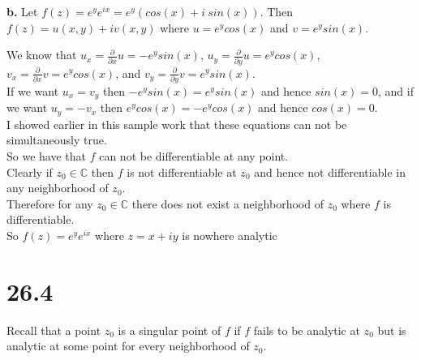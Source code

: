\documentclass{article}
\begin{document}
{\Large\textbf{b.}} Let $f(z) = e^y e^{ix} = e^y (cos(x) + i\:sin(x))$. Then $f(z) = u(x, y) + iv(x, y)$ where $u = e^y cos(x)$ and $v = e^y sin(x)$.
\begin{center}
    \doublespacing
    We know that $u_x =\frac{\partial}{\partial x} u = - e^y sin(x)$, $u_y =\frac{\partial}{\partial y} u = e^y cos(x)$, $v_x =\frac{\partial}{\partial x} v = e^y cos(x)$, and $v_y =\frac{\partial}{\partial y} v = e^y sin(x)$.
    \\If we want $u_x = v_y$ then $-e^y sin(x) = e^y sin(x)$ and hence $sin(x) = 0$, and if we want $u_y = -v_x$ then $e^y cos(x) = - e^y cos(x)$ and hence $cos(x) = 0$.
    \\I showed earlier in this sample work that these equations can not be simultaneously true.
    \\So we have that $f$ can not be differentiable at any point.
    \\Clearly if $z_0\in\mathbb{C}$ then $f$ is not differentiable at $z_0$ and hence not differentiable in any neighborhood of $z_0$.
    \\Therefore for any $z_0\in\mathbb{C}$ there does not exist a neighborhood of $z_0$ where $f$ is differentiable.
    \\So $f(z) = e^y e^{ix}$ where $z = x + iy$ is nowhere analytic \qedsymbol
\end{center}


\newpage
\section*{26.4}
\begin{center}
    \doublespacing
    Recall that a point $z_0$ is a singular point of $f$ if $f$ fails to be analytic at $z_0$ but is analytic at some point for every neighborhood of $z_0$.
\end{center}
\end{document}
